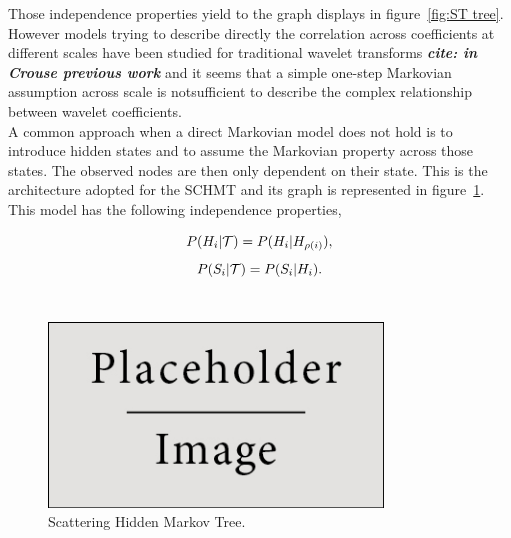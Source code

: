 \documentclass[a4paper,11pt]{report}
\begin{document}
{    Those independence properties yield to the graph displays in figure~\ref{fig:ST tree}. However models trying to describe directly the correlation across coefficients at different scales have been studied for traditional wavelet transforms \textbf{\textit{cite: in Crouse previous work}} and it seems that a simple one-step Markovian assumption across scale is notsufficient to describe the complex relationship between wavelet coefficients.\\
    
    A common approach when a direct Markovian model does not hold is to introduce hidden states and to assume the Markovian property across those states. The observed nodes are then only dependent on their state. This is the architecture adopted for the SCHMT and its graph is represented in figure~\ref{fig:SCHMT 1}. This model has the following independence properties,
    
    \begin{equation}
      P(H_{i} |\mathcal{T}) = P(H_{i} | H_{\rho(i)}),
      \label{eq:SCHMT - hypo 1}
    \end{equation}    
    \begin{equation}
      P(S_{i} |\mathcal{T}) = P(S_{i} | H_{i}).
      \label{eq:SCHMT - hypo 2}
    \end{equation} \\
    
		\begin{figure}
				\begin{center}
					\includegraphics[width=3.5in]{placeholder.jpg}
					\caption{Scattering Hidden Markov Tree.} %
					\label{fig:SCHMT 1}
				\end{center}
		\end{figure}
		
}
\end{document}
